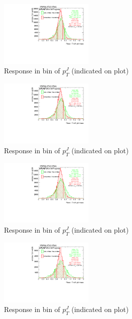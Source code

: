 \begin{figure}

\includegraphics[width=0.4\textwidth]{appendixB/mTASCOMB_W_calibmCal_030ro_20:38:43-03-11-2016/8ResponsePTJ_h_JetRatio_mJ08CALO.pdf}
\caption{Response in bin of  $p_{T}^{J}$ (indicated on plot)} 

\end{figure}

\begin{figure}

\includegraphics[width=0.4\textwidth]{appendixB/mTASCOMB_W_calibmCal_030ro_20:38:43-03-11-2016/8ResponsePTJ_h_JetRatio_mJ09CALO.pdf}
\caption{Response in bin of  $p_{T}^{J}$ (indicated on plot)} 

\end{figure}

\begin{figure}

\includegraphics[width=0.4\textwidth]{appendixB/mTASCOMB_W_calibmCal_030ro_20:38:43-03-11-2016/8ResponsePTJ_h_JetRatio_mJ10CALO.pdf}
\caption{Response in bin of  $p_{T}^{J}$ (indicated on plot)} 

\end{figure}

\begin{figure}

\includegraphics[width=0.4\textwidth]{appendixB/mTASCOMB_W_calibmCal_030ro_20:38:43-03-11-2016/8ResponsePTJ_h_JetRatio_mJ11CALO.pdf}
\caption{Response in bin of  $p_{T}^{J}$ (indicated on plot)} 

\end{figure}

